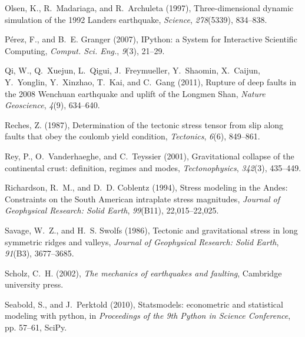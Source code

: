 \documentclass[twocolumn,jgrga]{AGUTeX}
\begin{document}
\begin{article}
{{{\begin{thebibliography}{89}
Olsen, K., R.~Madariaga, and R.~Archuleta (1997), Three-dimensional dynamic
  simulation of the 1992 {L}anders earthquake, \textit{Science},
  \textit{278}(5339), 834--838.

P\'erez, F., and B.~E. Granger (2007), {IP}ython: a {S}ystem for {I}nteractive
  {S}cientific {C}omputing, \textit{{C}omput. {S}ci. {E}ng.}, \textit{9}(3),
  21--29.

Qi, W., Q.~Xuejun, L.~Qigui, J.~Freymueller, Y.~Shaomin, X.~Caijun, Y.~Yonglin,
  Y.~Xinzhao, T.~Kai, and C.~Gang (2011), Rupture of deep faults in the 2008
  {W}enchuan earthquake and uplift of the {L}ongmen {S}han, \textit{Nature
  Geoscience}, \textit{4}(9), 634--640.

Reches, Z. (1987), Determination of the tectonic stress tensor from slip along
  faults that obey the coulomb yield condition, \textit{Tectonics},
  \textit{6}(6), 849--861.

Rey, P., O.~Vanderhaeghe, and C.~Teyssier (2001), Gravitational collapse of the
  continental crust: definition, regimes and modes, \textit{Tectonophysics},
  \textit{342}(3), 435--449.

Richardson, R.~M., and D.~D. Coblentz (1994), Stress modeling in the {A}ndes:
  Constraints on the {S}outh {A}merican intraplate stress magnitudes,
  \textit{Journal of Geophysical Research: Solid Earth}, \textit{99}(B11),
  22,015--22,025.

Savage, W.~Z., and H.~S. Swolfs (1986), Tectonic and gravitational stress in
  long symmetric ridges and valleys, \textit{Journal of Geophysical Research:
  Solid Earth}, \textit{91}(B3), 3677--3685.

Scholz, C.~H. (2002), \textit{The mechanics of earthquakes and faulting},
  Cambridge university press.

Seabold, S., and J.~Perktold (2010), Statsmodels: econometric and statistical
  modeling with python, in \textit{Proceedings of the 9th Python in Science
  Conference}, pp. 57--61, SciPy.


\end{thebibliography}}}}
\end{article}
\end{document}
